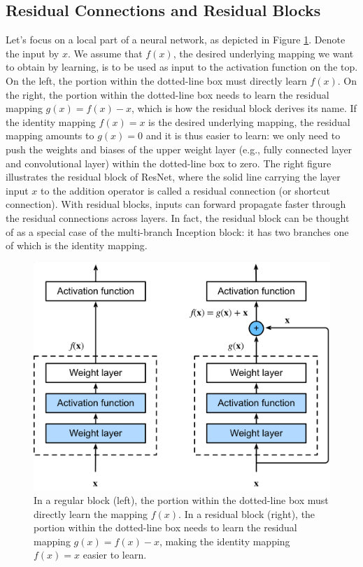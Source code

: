 \subsection{Residual Connections and Residual Blocks}
Let’s focus on a local part of a neural network, as depicted in Figure \ref{fig:ResBlock}. Denote the input by $x$. We assume that $f(x)$, the desired underlying mapping we want to obtain by learning, is to be used as input to the activation function on the top. On the left, the portion within the dotted-line box must directly learn $f(x)$. On the right, the portion within the dotted-line box needs to learn the residual mapping $g(x)=f(x)-x$, which is how the residual block derives its name. If the identity mapping $f(x)=x$ is the desired underlying mapping, the residual mapping amounts to $g(x)=0$ and it is thus easier to learn: we only need to push the weights and biases of the upper weight layer (e.g., fully connected layer and convolutional layer) within the dotted-line box to zero. The right figure illustrates the residual block of ResNet, where the solid line carrying the layer input $x$ to the addition operator is called a residual connection (or shortcut connection). With residual blocks, inputs can forward propagate faster through the residual connections across layers. In fact, the residual block can be thought of as a special case of the multi-branch Inception block: it has two branches one of which is the identity mapping.

\begin{figure}[H]
    \centering
    \includegraphics[width=0.7\linewidth]{Images/ResBlock.png}
    \caption{In a regular block (left), the portion within the dotted-line box must directly learn the mapping $f(x)$. In a residual block (right), the portion within the dotted-line box needs to learn the residual mapping $g(x)=f(x)-x$, making the identity mapping $f(x)=x$ easier to learn.}
    \label{fig:ResBlock}
\end{figure}

